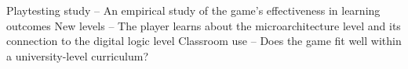 Playtesting study -- An empirical study of the game's effectiveness in learning outcomes
New levels -- The player learns about the microarchitecture level and its connection to the digital logic level
Classroom use -- Does the game fit well within a university-level curriculum?
